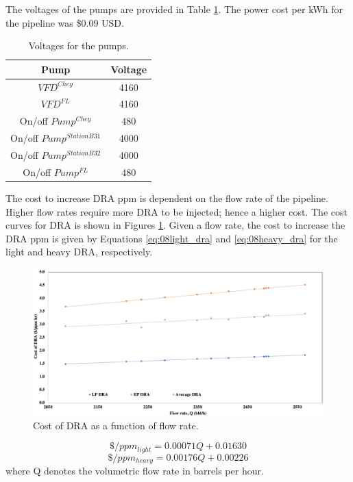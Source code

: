 The voltages of the pumps are provided in Table \ref{tab:08Voltages}.  The power cost per kWh for the pipeline was \$0.09 USD.
\begin{table}[h]
    \centering
    {
    \begin{tabular}{c|c}
        Pump          &  Voltage \\
        \hline
        $VFD^{Chey}$    &  4160    \\
        $VFD^{FL}$      &  4160    \\
        On/off $Pump^{Chey}$    & 480   \\
        On/off $Pump^{Station B31}$   & 4000  \\
        On/off $Pump^{Station B32}$   & 4000  \\
        On/off $Pump^{FL}$      & 480   \\
    \end{tabular}}
    \caption{Voltages for the pumps.}
    \label{tab:08Voltages}
\end{table}

The cost to increase DRA ppm is dependent on the flow rate of the pipeline. Higher flow rates require more DRA to be injected; hence a higher cost.  The cost curves for DRA is shown in Figures \ref{fig:08DRA_Cost}.  Given a flow rate, the cost to increase the DRA ppm is given by Equations \ref{eq:08light_dra} and \ref{eq:08heavy_dra} for the light and heavy DRA, respectively.

\begin{figure}[h]
    \centering
    \includegraphics[width=\textwidth]{images/suncor/08DRA_Cost.png}
    \caption{Cost of DRA as a function of flow rate.}
    \label{fig:08DRA_Cost}
\end{figure}

\begin{equation}
    \$ / ppm_{light} = 0.00071Q + 0.01630
    \label{eq:08light_dra}
\end{equation}
\begin{equation}
    \$ / ppm_{heavy} = 0.00176Q + 0.00226
    \label{eq:08heavy_dra}
\end{equation}
where Q denotes the volumetric flow rate in barrels per hour.

